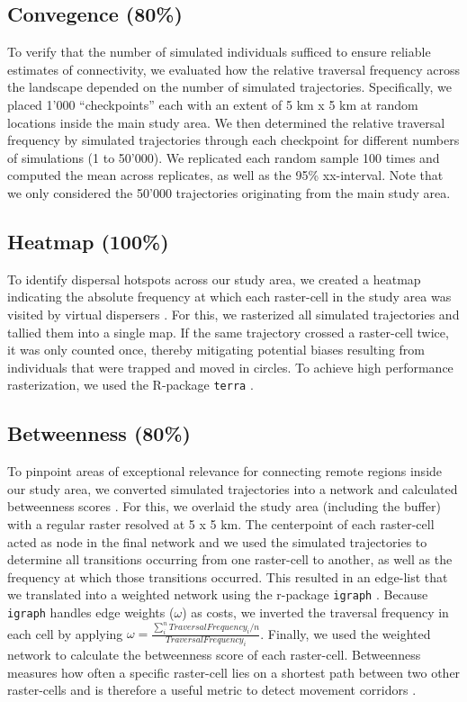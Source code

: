 \documentclass[abstract=on,10pt,a4paper,bibliography=totocnumbered]{article}
\begin{document}
\subsection{Convegence (80\%)}
To verify that the number of simulated individuals sufficed to ensure reliable
estimates of connectivity, we evaluated how the relative traversal frequency
across the landscape depended on the number of simulated trajectories.
Specifically, we placed 1'000 ``checkpoints'' each with an extent of 5 km x 5 km
at random locations inside the main study area. We then determined the relative
traversal frequency by simulated trajectories through each checkpoint for
different numbers of simulations (1 to 50'000). We replicated each random sample
100 times and computed the mean across replicates, as well as the 95\%
xx-interval. Note that we only considered the 50'000 trajectories originating
from the main study area.

\subsection{Heatmap (100\%)}
To identify dispersal hotspots across our study area, we created a heatmap
indicating the absolute frequency at which each raster-cell in the study area
was visited by virtual dispersers \citep{Hauenstein.2019, Peer.2008}. For this,
we rasterized all simulated trajectories and tallied them into a single map. If
the same trajectory crossed a raster-cell twice, it was only counted once,
thereby mitigating potential biases resulting from individuals that were trapped
and moved in circles. To achieve high performance rasterization, we used the
R-package {\tt terra} \citep{Hijmans.2020}.

\subsection{Betweenness (80\%)}
To pinpoint areas of exceptional relevance for connecting remote regions inside
our study area, we converted simulated trajectories into a network and
calculated betweenness scores \citep{BastilleRousseau.2018}. For this, we
overlaid the study area (including the buffer) with a regular raster resolved at
5 x 5 km. The centerpoint of each raster-cell acted as node in the final network
and we used the simulated trajectories to determine all transitions occurring
from one raster-cell to another, as well as the frequency at which those
transitions occurred. This resulted in an edge-list that we translated into a
weighted network using the r-package {\tt igraph} \citep{Gabor.2006}. Because
{\tt igraph} handles edge weights (\(\omega\)) as costs, we inverted the
traversal frequency in each cell by applying \(\omega = \frac{\sum_i^n{Traversal
Frequency_i}/n}{Traversal Frequency_i}\). Finally, we used the weighted network
to calculate the betweenness score of each raster-cell. Betweenness measures how
often a specific raster-cell lies on a shortest path between two other
raster-cells and is therefore a useful metric to detect movement corridors
\citep{BastilleRousseau.2018}.
\end{document}
